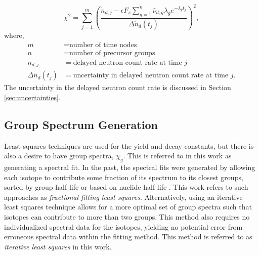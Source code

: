 \documentclass{style/nseJournal}
\begin{document}
\begin{equation}
\chi^2 = \sum_{j=1}^m \left( \frac{\dot{n}_{d,j} - \epsilon F_s \sum_{g=1}^n \bar{\nu}_{d, g} \lambda_g e^{-\lambda_g t_j}}{\Delta \dot{n}_d(t_j)}  \right)^2
\label{eq:chisq},
\end{equation}
where,
\begin{align}
    m &= \text{number of time nodes} \nonumber\\
    n &= \text{number of precursor groups} \nonumber\\
    \dot{n}_{d,j} &= \text{delayed neutron count rate at time $j$} \nonumber\\
    \Delta \dot{n}_d(t_j) &= \text{uncertainty in delayed neutron count rate at time $j$}. \nonumber
\end{align}
The uncertainty in the delayed neutron count rate is discussed in Section \ref{sec:uncertainties}.




\subsection{Group Spectrum Generation}
\label{sec:group-spec}

Least-squares techniques are used for the yield and decay constants, but there is also a desire to have group spectra, $\chi_g$.
This is referred to in this work as generating a spectral fit.
In the past, the spectral fits were generated by allowing each isotope to contribute some fraction of its spectrum to its closest groups, sorted by group half-life \cite{doi:10.13182/NSE77-A15209, doi:10.13182/NSE103-129, dnpthesis} or based on nuclide half-life \cite{doi:10.13182/NSE82-A21428, doi:10.13182/NSE83-A27422}.
This work refers to such approaches as \textit{fractional fitting least squares}.
Alternatively, using an iterative least squares technique allows for a more optimal set of group spectra such that isotopes can contribute to more than two groups. 
This method also requires no individualized spectral data for the isotopes, yielding no potential error from erroneous spectral data within the fitting method. 
This method is referred to as \textit{iterative least squares} in this work.
\end{document}
